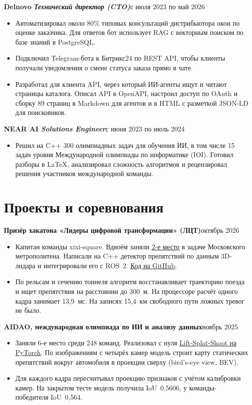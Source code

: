 \documentclass[10pt,a4paper]{article}
\newcommand{\role}[2]{\textbf{#1}\hfill{\small #2}\par}
\begin{document}
\vspace{3pt}
\role{Delnovo \normalfont\textit{\enspace Технический директор (CTO)}}{с июля 2023 по май 2026}
\begin{itemize}
  \item Автоматизировал около 80\% типовых консультаций дистрибьютора окон по оценке заказчика. Для ответов бот использует RAG с векторным поиском по базе знаний в PostgreSQL.
  \item Подключил Telegram-бота к Битрикс24 по REST API, чтобы клиенты получали уведомления о смене статуса заказа прямо в чате.
  \item Разработал для клиента API, через который ИИ-агенты ищут и читают страницы каталога. Описал API в OpenAPI, настроил доступ по OAuth и сборку 89 страниц в Markdown для агентов и в HTML с разметкой JSON-LD для поисковиков.
\end{itemize}
\vspace{3pt}
\role{NEAR AI \normalfont\textit{\enspace Solutions Engineer}}{с июня 2023 по июль 2024}
\begin{itemize}
  \item Решил на C++ 300 олимпиадных задач для обучения ИИ, в том числе 15 задач уровня Международной олимпиады по информатике (IOI). Готовил разборы в LaTeX, анализировал сложность алгоритмов и рецензировал решения участников международной команды.
\end{itemize}

\section{Проекты и соревнования}
\role{Призёр хакатона «Лидеры цифровой трансформации» (ЛЦТ)}{октябрь 2026}
\begin{itemize}
  \item Капитан команды xixi-square. Вдвоём заняли \href{https://i.moscow/upload/lending/lct2026/edebdf.pdf\#page=5}{\underline{2-е место}} в задаче Московского метрополитена. Написали на C++ детектор препятствий по данным 3D-лидара и интегрировали его с ROS~2. \href{https://github.com/iluuua/metro-lidar-obstacle-detection}{\underline{Код на GitHub}}.
  \item По рельсам и сечению тоннеля алгоритм восстанавливает траекторию поезда и ищет препятствия на расстоянии до 300~м. На процессоре расчёт одного кадра занимает 13,9~мс. На записях 15,4~км свободного пути ложных тревог не было.
\end{itemize}

\vspace{3pt}
\role{AIDAO, международная олимпиада по ИИ и анализу данных}{ноябрь 2025}
\begin{itemize}
  \item Заняли 6-е место среди 248 команд. Реализовал с нуля \href{https://github.com/iluuua/aidao-2025-bev-occupancy}{\underline{Lift-Splat-Shoot на PyTorch}}. По изображениям с четырёх камер модель строит карту статических препятствий вокруг автомобиля в проекции сверху (bird's-eye view, BEV).
  \item Для каждого кадра пересчитывал проекцию признаков с учётом калибровки камер. На закрытом тесте модель получила IoU~0,5606, у команды-победителя IoU~0,564.
\end{itemize}
\end{document}
